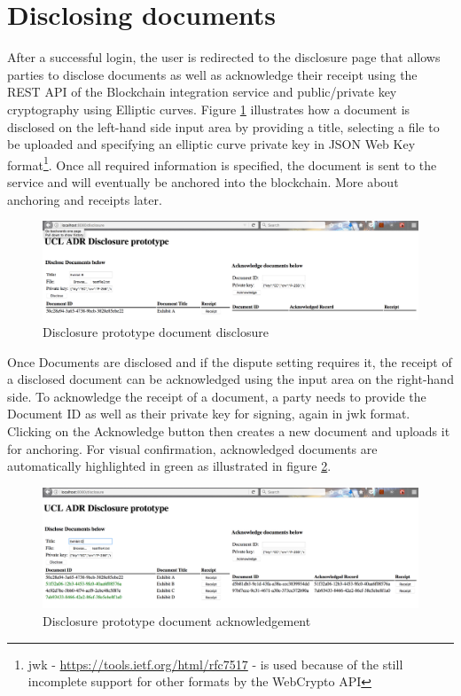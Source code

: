 \documentclass[12pt,msc,a4paper,oneside]{ucl_thesis}
\begin{document}
\section{Disclosing documents}
After a successful login, the user is redirected to the disclosure page that allows parties to disclose documents as well as acknowledge their receipt using the REST API of the Blockchain integration service and public/private key cryptography using Elliptic curves. Figure \ref{fig:proto_disclose} illustrates how a document is disclosed on the left-hand side input area by providing a title, selecting a file to be uploaded and specifying an elliptic curve private key in JSON Web Key format\footnote{jwk - \url{https://tools.ietf.org/html/rfc7517} - is used because of the still incomplete support for other formats by the WebCrypto API}. Once all required information is specified, the document is sent to the service and will eventually be anchored into the blockchain. More about anchoring and receipts later.
\begin{figure}[H]
    \includegraphics[width=1.0\textwidth]{./figures/proto_disclose.png}
    \caption{Disclosure prototype document disclosure}
    \label{fig:proto_disclose}
\end{figure}
\noindent Once Documents are disclosed and if the dispute setting requires it, the receipt of a disclosed document can be acknowledged using the input area on the right-hand side. To acknowledge the receipt of a document, a party needs to provide the Document ID as well as their private key for signing, again in jwk format. Clicking on the Acknowledge button then creates a new document and uploads it for anchoring. For visual confirmation, acknowledged documents are automatically highlighted in green as illustrated in figure \ref{fig:proto_acknowlege}.
\begin{figure}[H]
    \includegraphics[width=1.0\textwidth]{./figures/proto_acknowledge.png}
    \caption{Disclosure prototype document acknowledgement}
    \label{fig:proto_acknowlege}
\end{figure}
\end{document}

